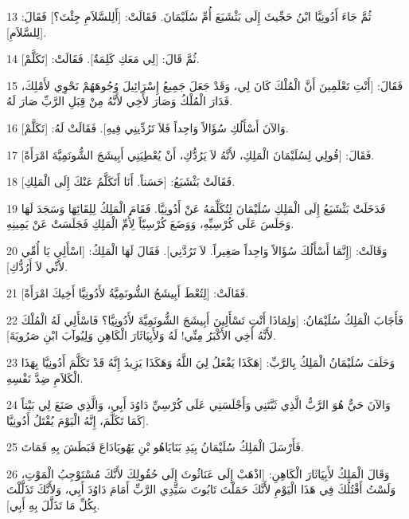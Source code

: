 \par 13 ثُمَّ جَاءَ أَدُونِيَّا ابْنُ حَجِّيثَ إِلَى بَثْشَبَعَ أُمِّ سُلَيْمَانَ. فَقَالَتْ: [أَلِلسَّلاَمِ جِئْتَ؟] فَقَالَ: [لِلسَّلاَمِ].
\par 14 ثُمَّ قَالَ: [لِي مَعَكِ كَلِمَةٌ]. فَقَالَتْ: [تَكَلَّمْ].
\par 15 فَقَالَ: [أَنْتِ تَعْلَمِينَ أَنَّ الْمُلْكَ كَانَ لِي، وَقَدْ جَعَلَ جَمِيعُ إِسْرَائِيلَ وُجُوهَهُمْ نَحْوِي لأَمْلِكَ، فَدَارَ الْمُلْكُ وَصَارَ لأَخِي لأَنَّهُ مِنْ قِبَلِ الرَّبِّ صَارَ لَهُ.
\par 16 وَالآنَ أَسْأَلُكِ سُؤَالاً وَاحِداً فَلاَ تَرُدِّينِي فِيهِ]. فَقَالَتْ لَهُ: [تَكَلَّمْ].
\par 17 فَقَالَ: [قُولِي لِسُلَيْمَانَ الْمَلِكِ، لأَنَّهُ لاَ يَرُدُّكِ، أَنْ يُعْطِيَنِي أَبِيشَجَ الشُّونَمِيَّةَ امْرَأَةً].
\par 18 فَقَالَتْ بَثْشَبَعُ: [حَسَناً. أَنَا أَتَكَلَّمُ عَنْكَ إِلَى الْمَلِكِ].
\par 19 فَدَخَلَتْ بَثْشَبَعُ إِلَى الْمَلِكِ سُلَيْمَانَ لِتُكَلِّمَهُ عَنْ أَدُونِيَّا. فَقَامَ الْمَلِكُ لِلِقَائِهَا وَسَجَدَ لَهَا وَجَلَسَ عَلَى كُرْسِيِّهِ، وَوَضَعَ كُرْسِيّاً لِأُمِّ الْمَلِكِ فَجَلَسَتْ عَنْ يَمِينِهِ.
\par 20 وَقَالَتْ: [إِنَّمَا أَسْأَلُكَ سُؤَالاً وَاحِداً صَغِيراً. لاَ تَرُدَّنِي]. فَقَالَ لَهَا الْمَلِكُ: [اسْأَلِي يَا أُمِّي لأَنِّي لاَ أَرُدُّكِ].
\par 21 فَقَالَتْ: [لِتُعْطَ أَبِيشَجُ الشُّونَمِيَّةُ لأَدُونِيَّا أَخِيكَ امْرَأَةً].
\par 22 فَأَجَابَ الْمَلِكُ سُلَيْمَانُ: [وَلِمَاذَا أَنْتِ تَسْأَلِينَ أَبِيشَجَ الشُّونَمِيَّةَ لأَدُونِيَّا؟ فَاسْأَلِي لَهُ الْمُلْكَ لأَنَّهُ أَخِي الأَكْبَرُ مِنِّي! لَهُ وَلأَبِيَاثَارَ الْكَاهِنِ وَلِيُوآبَ ابْنِ صَرُويَةَ].
\par 23 وَحَلَفَ سُلَيْمَانُ الْمَلِكُ بِالرَّبِّ: [هَكَذَا يَفْعَلُ لِيَ اللَّهُ وَهَكَذَا يَزِيدُ إِنَّهُ قَدْ تَكَلَّمَ أَدُونِيَّا بِهَذَا الْكَلاَمِ ضِدَّ نَفْسِهِ.
\par 24 وَالآنَ حَيٌّ هُوَ الرَّبُّ الَّذِي ثَبَّتَنِي وَأَجْلَسَنِي عَلَى كُرْسِيِّ دَاوُدَ أَبِي، وَالَّذِي صَنَعَ لِي بَيْتاً كَمَا تَكَلَّمَ، إِنَّهُ الْيَوْمَ يُقْتَلُ أَدُونِيَّا].
\par 25 فَأَرْسَلَ الْمَلِكُ سُلَيْمَانُ بِيَدِ بَنَايَاهُو بْنِ يَهُويَادَاعَ فَبَطَشَ بِهِ فَمَاتَ.
\par 26 وَقَالَ الْمَلِكُ لأَبِيَاثَارَ الْكَاهِنِ: [اذْهَبْ إِلَى عَنَاثُوثَ إِلَى حُقُولِكَ لأَنَّكَ مُسْتَوْجِبُ الْمَوْتِ، وَلَسْتُ أَقْتُلُكَ فِي هَذَا الْيَوْمِ لأَنَّكَ حَمَلْتَ تَابُوتَ سَيِّدِي الرَّبِّ أَمَامَ دَاوُدَ أَبِي، وَلأَنَّكَ تَذَلَّلْتَ بِكُلِّ مَا تَذَلَّلَ بِهِ أَبِي].
